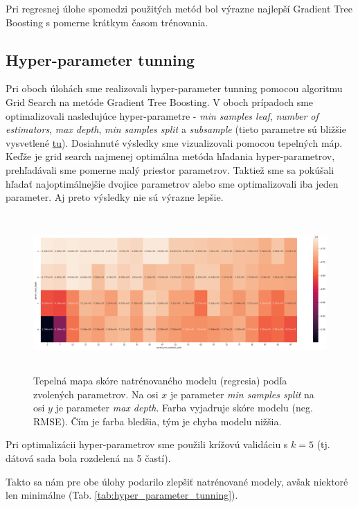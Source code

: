 \documentclass[runningheads]{llncs}
\begin{document}
Pri regresnej úlohe spomedzi použitých metód bol výrazne najlepší Gradient Tree Boosting s pomerne krátkym časom trénovania.

\subsection{Hyper-parameter tunning}

Pri oboch úlohách sme realizovali hyper-parameter tunning pomocou algoritmu Grid Search na metóde Gradient Tree Boosting. V oboch prípadoch sme optimalizovali nasledujúce hyper-parametre - \textit{min samples leaf}, \textit{number of estimators}, \textit{max depth}, \textit{min samples split} a \textit{subsample} (tieto parametre sú bližšie vysvetlené \href{https://scikit-learn.org/stable/modules/generated/sklearn.ensemble.GradientBoostingRegressor.html}{tu}). Dosiahnuté výsledky sme vizualizovali pomocou tepelných máp. Keďže je grid search najmenej optimálna metóda hľadania hyper-parametrov, prehľadávali sme pomerne malý priestor parametrov. Taktiež sme sa pokúšali hľadať najoptimálnejšie dvojice parametrov alebo sme optimalizovali iba jeden parameter. Aj preto výsledky nie sú výrazne lepšie.

\begin{figure}[htp]
    \centering
    \includegraphics[height=6cm]{images/hyper_parameter_tunning}
    \caption{Tepelná mapa skóre natrénovaného modelu (regresia) podľa zvolených parametrov. Na osi $x$ je parameter \textit{min samples split} na osi $y$ je parameter \textit{max depth}. Farba vyjadruje skóre modelu (neg. RMSE). Čím je farba bledšia, tým je chyba modelu nižšia.}
    \label{fig:hyper_parameter_tunning}
\end{figure}
 
Pri optimalizácii hyper-parametrov sme použili krížovú validáciu s $k=5$ (tj. dátová sada bola rozdelená na 5 častí).

Takto sa nám pre obe úlohy podarilo zlepšiť natrénované modely, avšak niektoré len minimálne (Tab. \ref{tab:hyper_parameter_tunning}).
\end{document}
